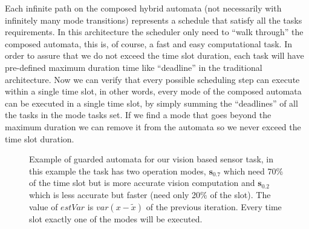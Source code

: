 \documentclass[ twoside, 12pt ]{article}
\begin{document}
{Each infinite path on the composed hybrid automata (not necessarily with infinitely many mode transitions) represents a schedule that satisfy all the tasks requirements. 
In this architecture the scheduler only need to ``walk through'' the composed automata, this is, of course, a fast and easy computational task. 
In order to assure that we do not exceed the time slot duration, each task will have pre-defined maximum duration time like ``deadline'' in the traditional architecture. Now we can verify that every possible scheduling step can execute within a single time slot, in other words, every mode of the composed automata can be executed in a single time slot, by simply summing the ``deadlines'' of all the tasks in the mode tasks set.
If we find a mode that goes beyond the maximum duration we can remove it from the automata so we never exceed the time slot duration.


\begin{figure}[]
    \centering
    
    
    \caption{Example of guarded automata for our vision based sensor task, in this example the task has two operation modes, $\mathbf{s_{0.7}}$ which need 70\% of the time slot but is more accurate vision computation and $\mathbf{s_{0.2}}$ which is less accurate but faster (need only 20\% of the slot).
        The value of $estVar$ is $var(x-\tilde{x})$ of the previous iteration.
        Every time slot exactly one of the modes will be executed.
        \label{fig:sched_sense_auto}}
\end{figure}

}
\end{document}
